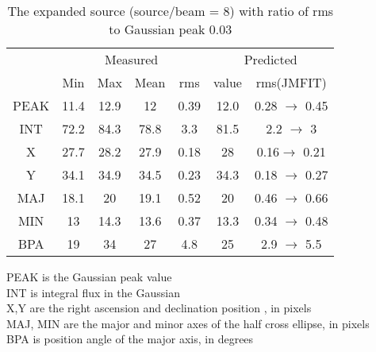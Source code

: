\begin{table}
\caption{The expanded source (source/beam = 8) with ratio of rms to Gaussian peak  0.03}
\label{tab:3}
\begin{center}
\begin{tabular}{|c| c c c c|c c|} \hline
& \multicolumn{4}{c|}{Measured} &\multicolumn{2}{c|}{Predicted}\\ \cline{2-7}
       & Min& Max& Mean &rms &value& rms(JMFIT)\\
 \hline
PEAK  & 11.4    & 12.9   & 12  & 0.39 & 12.0  &0.28 $\rightarrow$ 0.45\\
INT   & 72.2    &84.3   & 78.8   & 3.3 & 81.5   &2.2 $\rightarrow$ 3\\
X     & 27.7   & 28.2 & 27.9 & 0.18 & 28 &0.16$\rightarrow$ 0.21\\
Y     & 34.1   & 34.9 & 34.5 & 0.23 & 34.3 &0.18 $\rightarrow$ 0.27\\
MAJ   & 18.1    & 20 & 19.1  & 0.52 & 20  &0.46 $\rightarrow$ 0.66 \\
MIN   & 13    & 14.3  & 13.6  & 0.37 & 13.3  &0.34 $\rightarrow$ 0.48\\
BPA   & 19      &34     & 27    & 4.8   & 25    & 2.9 $\rightarrow$ 5.5\\
\hline
\end{tabular}
\end{center}
{\small
PEAK is the Gaussian peak value \\
INT is integral flux in the Gaussian \\
X,Y are the right ascension and declination position , in pixels \\
MAJ, MIN are the major and minor axes of the half cross ellipse, in pixels \\
BPA is position angle of the major axis, in degrees\\
}
\end{table}
